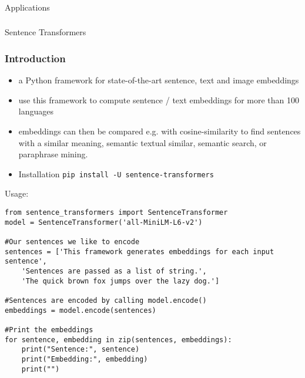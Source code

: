 \begin{frame}[fragile]\frametitle{}
\begin{center}
{\Large Applications}
\end{center}
\end{frame}

\begin{frame}[fragile]\frametitle{}
\begin{center}
{\Large Sentence Transformers}

\end{center}
\end{frame}

\begin{frame}[fragile]\frametitle{Introduction}

\begin{itemize}
\item  a Python framework for state-of-the-art sentence, text and image embeddings
\item use this framework to compute sentence / text embeddings for more than 100 languages
\item  embeddings can then be compared e.g. with cosine-similarity to find sentences with a similar meaning, semantic textual similar, semantic search, or paraphrase mining.
\item Installation \lstinline|pip install -U sentence-transformers|
\end{itemize}

Usage:

\begin{lstlisting}
from sentence_transformers import SentenceTransformer
model = SentenceTransformer('all-MiniLM-L6-v2')

#Our sentences we like to encode
sentences = ['This framework generates embeddings for each input sentence',
    'Sentences are passed as a list of string.',
    'The quick brown fox jumps over the lazy dog.']

#Sentences are encoded by calling model.encode()
embeddings = model.encode(sentences)

#Print the embeddings
for sentence, embedding in zip(sentences, embeddings):
    print("Sentence:", sentence)
    print("Embedding:", embedding)
    print("")
\end{lstlisting}

\end{frame}


